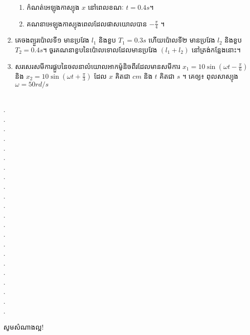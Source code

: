 \documentclass[12pt, a4paper]{article}
\begin{document}
\begin{enumerate}[m]
\begin{enumerate}[k]
			\item កំណត់អេឡុងកា​​​ស្យុង $x$ នៅពេលខណៈ $t=0.4s$។
			\item គណនាអេឡុងកា​​​ស្យុងពេលដែលផាសយោលបាន $-\frac{\pi}{4}$ ។
		\end{enumerate}
		\item គេចងព្យួរប៉ោលទី១ មានប្រវែង $l_1$ និងខួប $T_1=0.3s$ ហើយប៉ោលទី២ មានប្រវែង $l_2$ និងខួប $T_2=0.4s$។ ចូរគណនាខួបនៃប៉ោលទោលដែលមានប្រវែង $\left(l_1+l_2\right)$ នៅត្រង់កន្លែងនោះ។
		\item សរសេរសមីការផ្គួបនៃចលនាលំយោលអាកម៉ូនិចពីរដែលមានសមីការ $x_1=10\sin\left(\omega t -\frac{\pi}{6}\right)$ និង $x_2=10\sin\left(\omega t+ \frac{\pi}{3}\right)$ ដែល $x$ គិតជា $cm$ និង $t$ គិតជា $s$ ។ គេឲ្យ៖ ពុល​​សា​​ស្យុង$\omega = 50 rd/s$
	\end{enumerate}
	\\
	{\color{white}.}\dotfill\\
	{\color{white}.}\dotfill\\
	{\color{white}.}\dotfill\\
	{\color{white}.}\dotfill\\
	{\color{white}.}\dotfill\\
	{\color{white}.}\dotfill\\
	{\color{white}.}\dotfill\\
	{\color{white}.}\dotfill\\
	{\color{white}.}\dotfill\\
	{\color{white}.}\dotfill\\
	{\color{white}.}\dotfill\\
	{\color{white}.}\dotfill\\
	{\color{white}.}\dotfill\\
	{\color{white}.}\dotfill\\
	{\color{white}.}\dotfill\\
	{\color{white}.}\dotfill\\
	{\color{white}.}\dotfill\\
	{\color{white}.}\dotfill\\
	{\color{white}.}\dotfill\\
	{\color{white}.}\dotfill\\
	{\color{white}.}\dotfill\\
	{\color{white}.}\dotfill\\
	\begin{center}
		\sffamily\color{blue}
		សូមសំណាងល្អ!
	\end{center}\newpage
\end{document}
